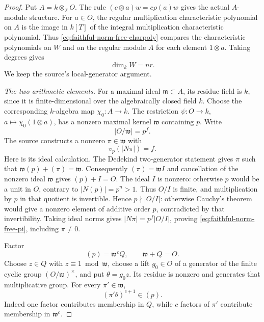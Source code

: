 \begin{proof}
Put \(A=k\otimes_{\mathbb Z}O\).  The rule
\((c\otimes a)w=c\rho(a)w\) gives the actual \(A\)-module
structure.  For \(a\in O\), the regular multiplication
characteristic polynomial on \(A\) is the image in \(k[T]\) of
the integral multiplication characteristic polynomial.
Thus \eqref{eq:faithful-norm-free-charpoly} compares the
characteristic polynomials on \(W\) and on the regular module
\(A\) for each element \(1\otimes a\).
Taking degrees gives
\[
                         \dim_kW=nr.
 \tag{NF4}\label{eq:faithful-norm-free-dimension}
\]
We keep the source's local-generator argument.

\emph{The two arithmetic elements.}
For a maximal ideal \(\mathfrak m\subset A\), its residue field
is \(k\), since it is finite-dimensional over the algebraically
closed field \(k\).  Choose the corresponding \(k\)-algebra map
\(\chi_0:A\to k\).
The restriction \(\psi:O\to k\), \(a\mapsto\chi_0(1\otimes a)\),
has a nonzero maximal kernel \(\mathfrak w\) containing \(p\).
Write
\[
                      |O/\mathfrak w|=p^f .
\]
The source constructs a nonzero \(\pi\in\mathfrak w\) with
\[
                       v_p(|N\pi|)=f .
 \tag{NF5}\label{eq:faithful-norm-free-pi}
\]
Here is its ideal calculation.
The Dedekind two-generator statement gives \(\pi\) such that
\(\mathfrak w(p)+(\pi)=\mathfrak w\).
Consequently \((\pi)=\mathfrak w I\) and cancellation of the
nonzero ideal \(\mathfrak w\) gives \((p)+I=O\).
The ideal \(I\) is nonzero: otherwise \(p\) would be a unit
in \(O\), contrary to \(|N(p)|=p^n>1\).
Thus \(O/I\) is finite, and multiplication by \(p\) in that
quotient is invertible.  Hence \(p\nmid |O/I|\): otherwise Cauchy's theorem
would give a nonzero element of additive order \(p\), contradicted
by that invertibility.
Taking ideal norms gives
\(|N\pi|=p^f|O/I|\), proving
\eqref{eq:faithful-norm-free-pi}, including \(\pi\ne0\).

Factor
\[
                  (p)=\mathfrak w^c Q,\qquad
                  \mathfrak w+Q=O.
\]
Choose \(z\in Q\) with \(z\equiv1\bmod\mathfrak w\), choose a
lift \(g_0\in O\) of a generator of the finite cyclic group
\((O/\mathfrak w)^\times\), and put \(\theta=g_0z\).
Its residue is nonzero and generates that multiplicative group.
For every \(\pi'\in\mathfrak w\),
\[
                         (\pi'\theta)^{c+1}\in(p).
 \tag{NF6}\label{eq:faithful-norm-free-theta}
\]
Indeed one factor contributes membership in \(Q\), while \(c\)
factors of \(\pi'\) contribute membership in \(\mathfrak w^c\).


\end{proof}
